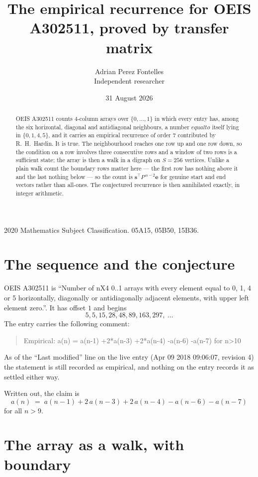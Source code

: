 \documentclass[11pt,a4paper]{article}
\title{The empirical recurrence for OEIS A302511, proved by transfer matrix}
\author{Adrian Perez Fontelles\\ \small Independent researcher}
\date{31 August 2026}
\theoremstyle{plain}
\theoremstyle{definition}
\begin{document}
\maketitle

\begin{abstract}
OEIS A302511 counts $4$-column arrays over $\{0,\dots,1\}$ in which every entry has,
among the six horizontal, diagonal and antidiagonal neighbours, a number $equal to$ itself lying in $\{0,1,4,5\}$, and it carries an empirical
recurrence of order $7$ contributed by R.~H.~Hardin. It is true. The neighbourhood
reaches one row up and one row down, so the condition on a row involves three consecutive
rows and a window of two rows is a sufficient state; the array is then a walk in a digraph
on $S=256$ vertices. Unlike a plain walk count the boundary rows matter here --- the first
row has nothing above it and the last nothing below --- so the count is
$\mathbf{s}^{\!\top}P^{\,n-2}\mathbf{e}$ for genuine start and end vectors rather than
all-ones. The conjectured recurrence is then annihilated exactly, in integer arithmetic.
\end{abstract}

\noindent\small 2020 Mathematics Subject Classification. 05A15, 05B50, 15B36.\normalsize

\section{The sequence and the conjecture}

OEIS A302511 is ``Number of nX4 0..1 arrays with every element equal to 0, 1, 4 or 5 horizontally, diagonally or antidiagonally adjacent elements, with upper left element zero.''. It has offset
$1$ and begins
\[
5, 5, 15, 28, 48, 89, 163, 297,\ \dots
\]
The entry carries the following comment:
\begin{quote}\small
Empirical: a(n) = a(n-1) +2*a(n-3) +2*a(n-4) -a(n-6) -a(n-7) for n>10
\end{quote}
As of the ``Last modified'' line on the live entry (Apr 09 2018 09:06:07, revision
4) the statement is still recorded as empirical, and nothing on the entry
records it as settled either way.

Written out, the claim is
\begin{equation}\label{eq:conj}
a(n)\;=\;a(n-1) + 2\,a(n-3) + 2\,a(n-4) - a(n-6) - a(n-7)
\end{equation}
for all $n>9$.

\section{The array as a walk, with boundary}
\end{document}
